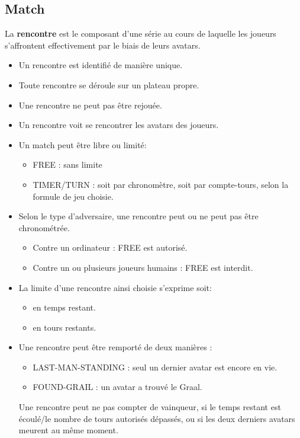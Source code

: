 \subsection{Match}
La \textbf{rencontre} est le composant d'une série au cours de laquelle les joueurs s'affrontent effectivement par le biais de leurs avatars.
    \begin{itemize}
        \item Un rencontre est identifié de manière unique.
        \item Toute rencontre se déroule sur un plateau propre.
        \item Une rencontre ne peut pas être rejouée.
        \item Un rencontre voit se rencontrer les avatars des joueurs.
    
        \item Un match peut être libre ou limité:
            \begin{itemize}
                \item FREE : sans limite
                \item TIMER/TURN : soit par chronomètre, soit par compte-tours, selon la formule de jeu choisie.
            \end{itemize}
    
        \item Selon le type d'adversaire, une rencontre peut ou ne peut pas être chronométrée.
            \begin{itemize}
                \item Contre un ordinateur : FREE est autorisé.
                \item Contre un ou plusieurs joueurs humains : FREE est interdit.
            \end{itemize}
        
        \item La limite d'une rencontre ainsi choisie s'exprime soit:
            \begin{itemize}
                \item en temps restant.
                \item en tours restants.
            \end{itemize}
    
        \item Une rencontre peut être remporté de deux manières :
            \begin{itemize}
                \item LAST-MAN-STANDING : seul un dernier avatar est encore en vie.
                \item FOUND-GRAIL : un avatar a trouvé le Graal.
            \end{itemize}
        \begin{tcolorbox}
            Une rencontre peut ne pas compter de vainqueur, si le temps restant est écoulé/le nombre de tours autorisés dépassés, ou si les deux derniers avatars meurent au même moment.
        \end{tcolorbox}
        

\end{itemize}
